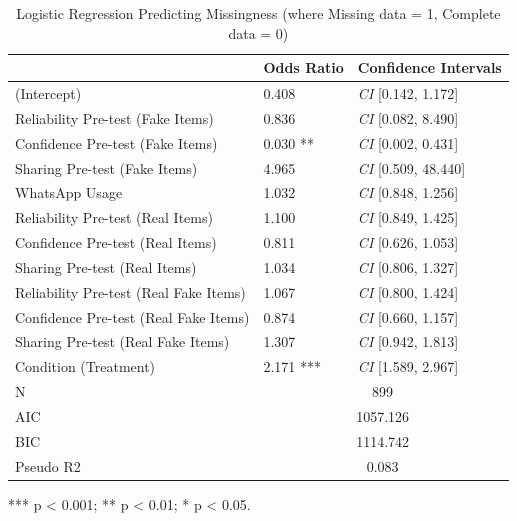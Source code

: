 \documentclass[empirical, authordate]{jote-new-article}
\begin{document}
\begin{table}[h!]

  \caption{Logistic Regression Predicting Missingness (where Missing data = 1, Complete data = 0) }
  \label{tab:tableS1}


  \begin{tabularx}{\linewidth}{@{} X  l  l@{}}

    \toprule                               & Odds Ratio                   & Confidence Intervals      \\
    \midrule
    (Intercept)                            & 0.408                        & \emph{CI} [0.142, 1.172]  \\
    Reliability Pre-test (Fake Items)      & 0.836                        & \emph{CI} [0.082, 8.490]  \\
    Confidence Pre-test (Fake Items)       & 0.030 **                     & \emph{CI} [0.002, 0.431]  \\
    Sharing Pre-test (Fake Items)          & 4.965                        & \emph{CI} [0.509, 48.440] \\
    \mbox{WhatsApp} Usage                  & 1.032                        & \emph{CI} [0.848, 1.256]  \\
    Reliability Pre-test (Real Items)      & 1.100                        & \emph{CI} [0.849, 1.425]  \\
    Confidence Pre-test (Real Items)       & 0.811                        & \emph{CI} [0.626, 1.053]  \\
    Sharing Pre-test (Real Items)          & 1.034                        & \emph{CI} [0.806, 1.327]  \\
    Reliability Pre-test (Real Fake Items) & 1.067                        & \emph{CI} [0.800, 1.424]  \\
    Confidence Pre-test (Real Fake Items)  & 0.874                        & \emph{CI} [0.660, 1.157]  \\
    Sharing Pre-test (Real Fake Items)     & 1.307                        & \emph{CI} [0.942, 1.813]  \\
    Condition (Treatment)                  & 2.171 ***                    & \emph{CI} [1.589, 2.967]  \\
    \midrule
    N                                      & \multicolumn{2}{c}{899}                                  \\
    AIC                                    & \multicolumn{2}{c}{1057.126}                             \\
    BIC                                    & \multicolumn{2}{c}{1114.742}                             \\
    Pseudo R2                              & \multicolumn{2}{c}{0.083}                                \\
    \bottomrule
  \end{tabularx}
  *** p < 0.001; ** p < 0.01; * p < 0.05.


\end{table}
\end{document}
